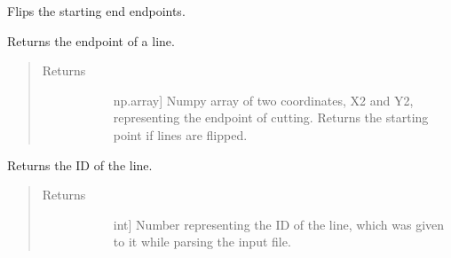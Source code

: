 \documentclass[letterpaper,10pt,english,openany,oneside]{sphinxmanual}
\begin{document}
\begin{fulllineitems}
\begin{fulllineitems}
\label{\detokenize{reference:cnc.optimization.Line.flip_line}}
Flips the starting end endpoints.

\end{fulllineitems}


\begin{fulllineitems}
\label{\detokenize{reference:cnc.optimization.Line.get_endpoint}}
Returns the endpoint of a line.
\begin{quote}\begin{description}
\item[{Returns}] \leavevmode\begin{description}
\item[{}] \leavevmode{[}np.array{]}
Numpy array of two coordinates, X2 and Y2, representing the
endpoint of cutting. Returns the starting point if lines are
flipped.

\end{description}

\end{description}\end{quote}

\end{fulllineitems}


\begin{fulllineitems}
\label{\detokenize{reference:cnc.optimization.Line.get_line_id}}
Returns the ID of the line.
\begin{quote}\begin{description}
\item[{Returns}] \leavevmode\begin{description}
\item[{}] \leavevmode{[}int{]}
Number representing the ID of the line, which was given to it while
parsing the input file.

\end{description}


\end{description}
\end{quote}
\end{fulllineitems}
\end{fulllineitems}
\end{document}
